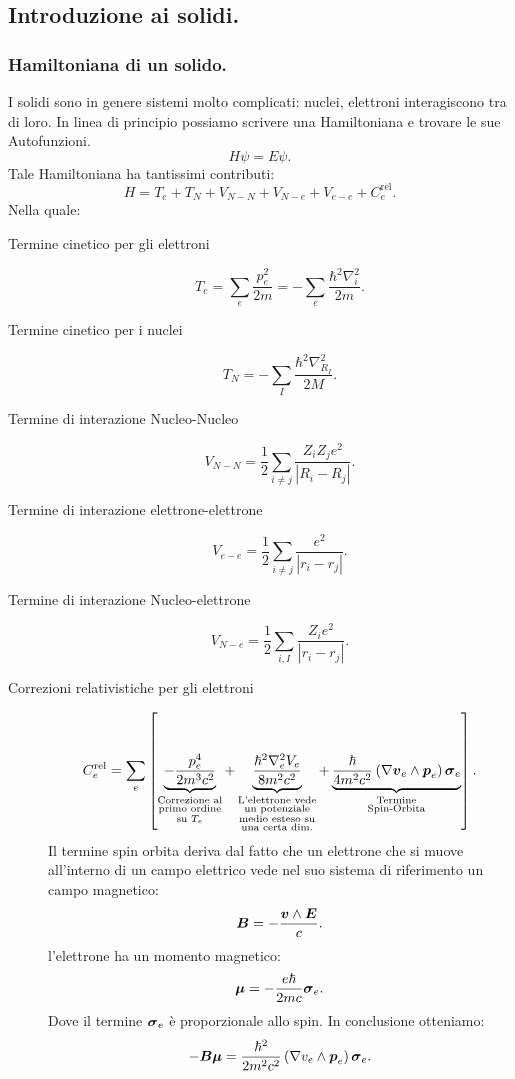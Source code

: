 \subsection{Introduzione ai solidi.}
\label{subsec:Solidi}
\subsubsection{Hamiltoniana di un solido.}%
\label{subsub:Hamiltoniana di un solido.}

I solidi sono in genere sistemi molto complicati: nuclei, elettroni interagiscono tra di loro. In linea di principio possiamo scrivere una Hamiltoniana e trovare le sue Autofunzioni.
\[
	H \psi = E \psi
.\] 
Tale Hamiltoniana ha tantissimi contributi:
\[
	H = T_e + T_N + V_{N-N} + V_{N-e} + V_{e-e} + C_e^{\text{rel}}
.\] 
Nella quale:
\begin{description}
	\item[Termine cinetico per gli elettroni] 
		 \[
			T_e = \sum_{e}^{} \frac{p_e^2}{2m} 
			= -\sum_{e}^{} \frac{\hbar ^2 \nabla_i^2}{2m}
		.\] 

	\item[Termine cinetico per i nuclei] 
		\[
			T_N 
			=
			-\sum_{I}^{} \frac{\hbar ^2 \nabla_{R_I}^2}{2M}
		.\] 
	\item[Termine di interazione Nucleo-Nucleo]
		\[
			V_{N-N} = 
			\frac{1}{2}\sum_{i\neq j}^{} 
			\frac{Z_iZ_je^2}{\left| R_i - R_j \right| }
		.\]  
	\item[Termine di interazione elettrone-elettrone]
		\[
			V_{e-e} = 
			\frac{1}{2}\sum_{i\neq j}^{} 
			\frac{e^2}{\left| r_i - r_j \right| }
		.\]
	\item[Termine di interazione Nucleo-elettrone]
		\[
			V_{N-e} = 
			\frac{1}{2}\sum_{i,I}^{} 
			\frac{Z_ie^2}{\left| r_i - r_j \right| }
		.\]
	\item[Correzioni relativistiche per gli elettroni]
		\[
			C_e^{\text{rel}} 
			=
			\sum_{e}^{} \left[ \underbrace{-\frac{p_e^4}{2m^3c^2}}_
			{\substack{\text{Correzione al}\\ 
			\text{primo ordine}\\ 
			\text{su $T_e$}}}
			+ 
			\underbrace{\frac{\hbar ^2 \nabla_e^2 V_e}{8m^2c^2}}_
			{\substack{\text{L'elettrone vede}\\
			\text{un potenziale}\\
			\text{medio esteso su}\\
			\text{una certa dim.}}}
			+
			\underbrace{\frac{\hbar }{4m^2c^2}
			\left( \nabla \boldsymbol{v}_e \wedge\boldsymbol{p}_e\right) 
			\boldsymbol{\sigma}_e}_
			{\substack{\text{Termine}\\
			\text{Spin-Orbita}}}
			\right] 
		.\] 
		Il termine spin orbita deriva dal fatto che un elettrone che si muove
		all'interno di un campo elettrico vede nel suo sistema di riferimento
		un campo magnetico:
		\[
			\boldsymbol{B} = -\frac{\boldsymbol{v}\wedge \boldsymbol{E}}{c}
		.\] 
		l'elettrone ha un momento magnetico:
		\[
			\boldsymbol{\mu} = - \frac{e\hbar }{2mc} \boldsymbol{\sigma}_e
		.\] 
		Dove il termine $\boldsymbol{\sigma}_e$ è proporzionale allo spin. In conclusione otteniamo:
		\[
			-\boldsymbol{B}\boldsymbol{\mu} 
			=
			\frac{\hbar ^2}{2m^2c^2}\left( \nabla v_e \wedge \boldsymbol{p}_e \right)
			\boldsymbol{\sigma}_e
		.\] 
\end{description}
